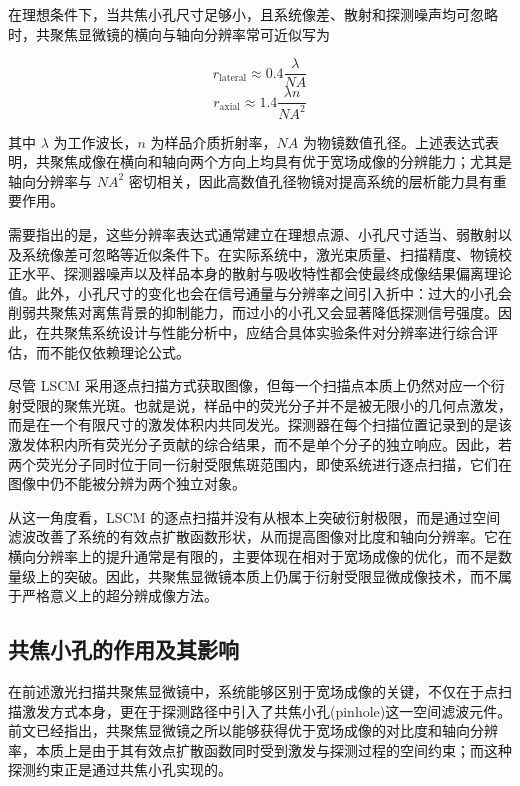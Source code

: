 在理想条件下，当共焦小孔尺寸足够小，且系统像差、散射和探测噪声均可忽略时，共聚焦显微镜的横向与轴向分辨率常可近似写为

\begin{equation}
r_{\mathrm{lateral}}\approx 0.4\frac{\lambda}{NA}
\end{equation}
\begin{equation}
r_{\mathrm{axial}}\approx 1.4\frac{\lambda n}{NA^2}
\end{equation}

其中 $\lambda$ 为工作波长，$n$ 为样品介质折射率，$NA$ 为物镜数值孔径。上述表达式表明，共聚焦成像在横向和轴向两个方向上均具有优于宽场成像的分辨能力；尤其是轴向分辨率与 $NA^2$ 密切相关，因此高数值孔径物镜对提高系统的层析能力具有重要作用。

需要指出的是，这些分辨率表达式通常建立在理想点源、小孔尺寸适当、弱散射以及系统像差可忽略等近似条件下。在实际系统中，激光束质量、扫描精度、物镜校正水平、探测器噪声以及样品本身的散射与吸收特性都会使最终成像结果偏离理论值。此外，小孔尺寸的变化也会在信号通量与分辨率之间引入折中：过大的小孔会削弱共聚焦对离焦背景的抑制能力，而过小的小孔又会显著降低探测信号强度。因此，在共聚焦系统设计与性能分析中，应结合具体实验条件对分辨率进行综合评估，而不能仅依赖理论公式。

尽管 LSCM 采用逐点扫描方式获取图像，但每一个扫描点本质上仍然对应一个衍射受限的聚焦光斑。也就是说，样品中的荧光分子并不是被无限小的几何点激发，而是在一个有限尺寸的激发体积内共同发光。探测器在每个扫描位置记录到的是该激发体积内所有荧光分子贡献的综合结果，而不是单个分子的独立响应。因此，若两个荧光分子同时位于同一衍射受限焦斑范围内，即使系统进行逐点扫描，它们在图像中仍不能被分辨为两个独立对象。

从这一角度看，LSCM 的逐点扫描并没有从根本上突破衍射极限，而是通过空间滤波改善了系统的有效点扩散函数形状，从而提高图像对比度和轴向分辨率。它在横向分辨率上的提升通常是有限的，主要体现在相对于宽场成像的优化，而不是数量级上的突破。因此，共聚焦显微镜本质上仍属于衍射受限显微成像技术，而不属于严格意义上的超分辨成像方法。



\subsection{共焦小孔的作用及其影响}\label{3.1.4}

在前述激光扫描共聚焦显微镜中，系统能够区别于宽场成像的关键，不仅在于点扫描激发方式本身，更在于探测路径中引入了共焦小孔(pinhole)这一空间滤波元件。前文已经指出，共聚焦显微镜之所以能够获得优于宽场成像的对比度和轴向分辨率，本质上是由于其有效点扩散函数同时受到激发与探测过程的空间约束；而这种探测约束正是通过共焦小孔实现的。

